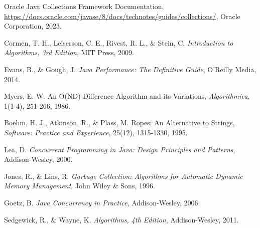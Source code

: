 \begin{thebibliography}{9}

 Oracle Java Collections Framework Documentation,
\newblock \url{https://docs.oracle.com/javase/8/docs/technotes/guides/collections/},
\newblock Oracle Corporation, 2023.

 Cormen, T. H., Leiserson, C. E., Rivest, R. L., \& Stein, C.
\newblock \textit{Introduction to Algorithms, 3rd Edition},
\newblock MIT Press, 2009.

 Evans, B., \& Gough, J.
\newblock \textit{Java Performance: The Definitive Guide},
\newblock O'Reilly Media, 2014.

 Myers, E. W.
\newblock An O(ND) Difference Algorithm and its Variations,
\newblock \textit{Algorithmica}, 1(1-4), 251-266, 1986.

 Boehm, H. J., Atkinson, R., \& Plass, M.
\newblock Ropes: An Alternative to Strings,
\newblock \textit{Software: Practice and Experience}, 25(12), 1315-1330, 1995.

 Lea, D.
\newblock \textit{Concurrent Programming in Java: Design Principles and Patterns},
\newblock Addison-Wesley, 2000.

 Jones, R., \& Lins, R.
\newblock \textit{Garbage Collection: Algorithms for Automatic Dynamic Memory Management},
\newblock John Wiley \& Sons, 1996.

 Goetz, B.
\newblock \textit{Java Concurrency in Practice},
\newblock Addison-Wesley, 2006.

 Sedgewick, R., \& Wayne, K.
\newblock \textit{Algorithms, 4th Edition},
\newblock Addison-Wesley, 2011.

\end{thebibliography} 